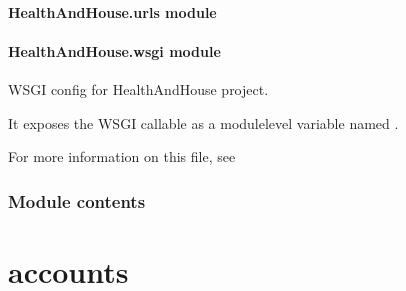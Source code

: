 \documentclass[a4paper,11pt,spanish]{sphinxmanual}
\begin{document}
\sphinxstepscope


\subsubsection{HealthAndHouse.urls module}
\label{\detokenize{api/HealthAndHouse/HealthAndHouse.urls:module-HealthAndHouse.urls}}\label{\detokenize{api/HealthAndHouse/HealthAndHouse.urls:healthandhouse-urls-module}}\label{\detokenize{api/HealthAndHouse/HealthAndHouse.urls::doc}}
\sphinxstepscope


\subsubsection{HealthAndHouse.wsgi module}
\label{\detokenize{api/HealthAndHouse/HealthAndHouse.wsgi:module-HealthAndHouse.wsgi}}\label{\detokenize{api/HealthAndHouse/HealthAndHouse.wsgi:healthandhouse-wsgi-module}}\label{\detokenize{api/HealthAndHouse/HealthAndHouse.wsgi::doc}}
\sphinxAtStartPar
WSGI config for HealthAndHouse project.

\sphinxAtStartPar
It exposes the WSGI callable as a module\sphinxhyphen{}level variable named .

\sphinxAtStartPar
For more information on this file, see


\subsection{Module contents}
\label{\detokenize{api/HealthAndHouse/HealthAndHouse:module-HealthAndHouse}}\label{\detokenize{api/HealthAndHouse/HealthAndHouse:module-contents}}
\sphinxstepscope


\chapter{accounts}
\label{\detokenize{api/accounts/modules:accounts}}\label{\detokenize{api/accounts/modules::doc}}
\sphinxstepscope
\end{document}
